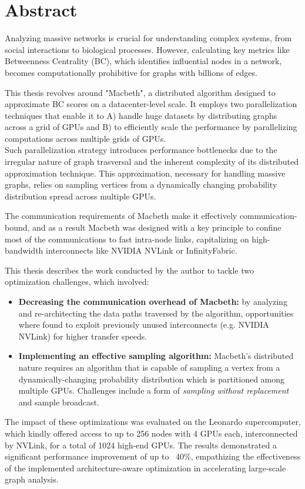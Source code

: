 \chapter*{Abstract}
\label{cha:abtract}
\setlength{\parindent}{0pt}
\setlength{\parskip}{0.5em}


Analyzing massive networks is crucial for understanding complex systems, from social interactions to biological processes. However, calculating key metrics like Betweenness Centrality (BC), which identifies influential nodes in a network, becomes computationally prohibitive for graphs with billions of edges. 

This thesis revolves around "Macbeth", a distributed algorithm designed to approximate BC scores on a datacenter-level scale. It employs two parallelization techniques that enable it to A) handle huge datasets by distributing graphs across a grid of GPUs and B) to efficiently scale the performance by parallelizing computations across multiple grids of GPUs. \\
Such parallelization strategy introduces performance bottlenecks due to the irregular nature of graph trasversal and the inherent complexity of its distributed approximation technique. This approximation, necessary for handling massive graphs, relies on sampling vertices from a dynamically changing probability distribution spread across multiple GPUs. 

The communication requirements of Macbeth make it effectively communication-bound, and as a result Macbeth was designed with a key principle to confine most of the communications to fast intra-node links, capitalizing on high-bandwidth interconnects like NVIDIA NVLink or InfinityFabric.

This thesis describes the work conducted by the author to tackle two optimization challenges, which involved:
\begin{itemize}
	\item \textbf{Decreasing the communication overhead of Macbeth:} by analyzing and re-architecting the data paths traversed by the algorithm, opportunities where found to exploit previously unused interconnects (e.g. NVIDIA NVLink) for higher transfer speeds. 
	\item \textbf{Implementing an effective sampling algorithm:} Macbeth's distributed nature requires an algorithm that is capable of sampling a vertex from a dynamically-changing probability distribution which is partitioned among multiple GPUs. Challenges include a form of \textit{sampling without replacement} and sample broadcast. 
\end{itemize}

The impact of these optimizations was evaluated on the Leonardo supercomputer, which kindly offered access to up to 256 nodes with 4 GPUs each, interconnected by NVLink, for a total of 1024 high-end GPUs. The results demonstrated a significant performance improvement of up to ~40\%, empathizing the effectiveness of the implemented architecture-aware optimization in accelerating large-scale graph analysis.
